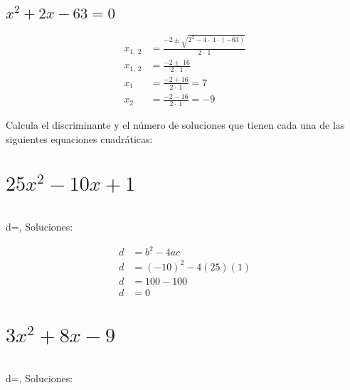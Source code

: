 \documentclass[12pt,addpoints]{evalua}
\begin{document}
\begin{questions}
\begin{multicols}{2}
\begin{parts}
            \part {\Large $x^2+2x-63=0$}

            \begin{solutionbox}{6cm}
                \begin{align*}
                    x_{1,\:2} & =\frac{-2\pm \sqrt{2^2-4\cdot \:1\cdot \left(-63\right)}}{2\cdot \:1} \\
                    x_{1,\:2} & =\frac{-2\pm \:16}{2\cdot \:1}                                        \\
                    x_1       & =\frac{-2+16}{2\cdot \:1}=7                                           \\
                    x_2       & =\frac{-2-16}{2\cdot \:1}=-9
                \end{align*}
            \end{solutionbox}

        \end{parts}
    \end{multicols}

    \question[8] Calcula el discriminante y el número de soluciones que tienen cada una de las siguientes equaciones cuadráticas:
    \begin{multicols}{2}
        \begin{parts}
            \part {\Large$25x^2-10x+1$} \\ d=\fillin[$0$][1cm], Soluciones: \fillin[$1$][1cm]

            \begin{solutionbox}{4cm}
                \begin{align*}
                    d & = b^2-4ac          \\
                    d & = (-10)^2-4(25)(1) \\
                    d & = 100-100          \\
                    d & = 0
                \end{align*}
            \end{solutionbox}

            \part {\Large $3x^2+8x-9$} \\ d=\fillin[$172$][1cm], Soluciones: \fillin[$2$][1cm]


\end{parts}
\end{multicols}
\end{questions}
\end{document}
